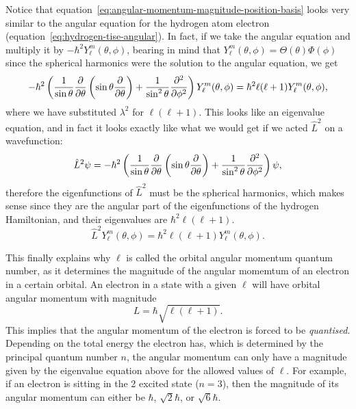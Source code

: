 \documentclass[../quantum_mechanics.tex]{subfiles}
\begin{document}
            Notice that equation~\ref{eq:angular-momentum-magnitude-position-basis} looks very similar to the angular equation for the hydrogen atom electron (equation~\ref{eq:hydrogen-tise-angular}).
            In fact, if we take the angular equation and multiply it by $-\hbar^2Y_\ell^m(\theta,\phi)$, bearing in mind that $Y_\ell^m(\theta,\phi)=\Theta(\theta)\Phi(\phi)$ since the spherical harmonics were the solution to the angular equation, we get
            \begin{equation}
                -\hbar^2\left(\frac{1}{\sin\theta}\pdv{}{\theta}\left(\sin\theta\pdv{}{\theta}\right)+\frac{1}{\sin^2\theta}\pdv[2]{}{\phi}\right)Y_\ell^m(\theta,\phi)=\hbar^2\ell(\ell+1)Y_\ell^m(\theta,\phi),
            \end{equation}
            where we have substituted $\lambda^2$ for $\ell(\ell+1)$.
            This looks like an eigenvalue equation, and in fact it looks exactly like what we would get if we acted $\hat{L}^2$ on a wavefunction:
            \begin{equation}
                \hat{L}^2\psi=-\hbar^2\left(\frac{1}{\sin\theta}\pdv{}{\theta}\left(\sin\theta\pdv{}{\theta}\right)+\frac{1}{\sin^2\theta}\pdv[2]{}{\phi}\right)\psi,
            \end{equation}
            therefore the eigenfunctions of $\hat{L}^2$ must be the spherical harmonics, which makes sense since they are the angular part of the eigenfunctions of the hydrogen Hamiltonian, and their eigenvalues are $\hbar^2\ell(\ell+1)$.
            \begin{equation}
                \hat{L}^2Y_\ell^m(\theta,\phi)=\hbar^2\ell(\ell+1)Y_\ell^m(\theta,\phi).
            \end{equation}

            This finally explains why $\ell$ is called the orbital angular momentum quantum number, as it determines the magnitude of the angular momemtum of an electron in a certain orbital.
            An electron in a state with a given $\ell$ will have orbital angular momentum with magnitude
            \begin{equation}
                L=\hbar\sqrt{\ell(\ell+1)}.
            \end{equation}
            This implies that the angular momentum of the electron is forced to be \textit{quantised}.
            Depending on the total energy the electron has, which is determined by the principal quantum number $n$, the angular momentum can only have a magnitude given by the eigenvalue equation above for the allowed values of $\ell$.
            For example, if an electron is sitting in the {2} excited state ($n=3$), then the magnitude of its angular momentum can either be $\hbar$, $\sqrt{2}\hbar$, or $\sqrt{6}\hbar$.
\end{document}
